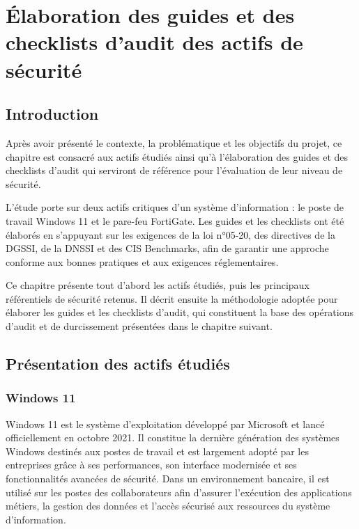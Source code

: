 \chapter{Élaboration des guides et des checklists d'audit des actifs de sécurité}
\label{chap:guides}

\section{Introduction}

Après avoir présenté le contexte, la problématique et les objectifs du projet, ce chapitre est consacré aux actifs étudiés ainsi qu'à l'élaboration des guides et des checklists d'audit qui serviront de référence pour l'évaluation de leur niveau de sécurité.

L'étude porte sur deux actifs critiques d'un système d'information : le poste de travail Windows 11 et le pare-feu FortiGate. Les guides et les checklists ont été élaborés en s'appuyant sur les exigences de la loi n°05-20, des directives de la DGSSI, de la DNSSI et des CIS Benchmarks, afin de garantir une approche conforme aux bonnes pratiques et aux exigences réglementaires.

Ce chapitre présente tout d'abord les actifs étudiés, puis les principaux référentiels de sécurité retenus. Il décrit ensuite la méthodologie adoptée pour élaborer les guides et les checklists d'audit, qui constituent la base des opérations d'audit et de durcissement présentées dans le chapitre suivant.

\section{Présentation des actifs étudiés}

\subsection{Windows 11}

Windows 11 est le système d'exploitation développé par Microsoft et lancé officiellement en octobre 2021. Il constitue la dernière génération des systèmes Windows destinés aux postes de travail et est largement adopté par les entreprises grâce à ses performances, son interface modernisée et ses fonctionnalités avancées de sécurité. Dans un environnement bancaire, il est utilisé sur les postes des collaborateurs afin d'assurer l'exécution des applications métiers, la gestion des données et l'accès sécurisé aux ressources du système d'information.


